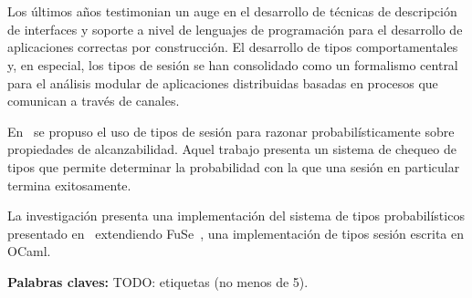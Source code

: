 \chapter*{\runtitulo}

Los últimos años testimonian un auge en el desarrollo de técnicas de
descripción de interfaces y soporte a nivel de lenguajes de
programación para el desarrollo de aplicaciones correctas por construcción. El
desarrollo de tipos comportamentales y, en especial, los tipos de sesión
se han consolidado como un formalismo central para el análisis modular de
aplicaciones distribuidas basadas en procesos que comunican a través de canales.

En~\cite{DBLP:conf/concur/InversoMPTT20} se propuso el uso de tipos de sesión
para razonar probabilísticamente sobre propiedades de alcanzabilidad. Aquel
trabajo presenta un sistema de chequeo de tipos que permite determinar la
probabilidad con la que una sesión en particular termina exitosamente.

La investigación presenta una implementación del sistema de tipos
probabilísticos presentado en~\cite{DBLP:conf/concur/InversoMPTT20} extendiendo
FuSe~\cite{DBLP:journals/jfp/Padovani17}, una implementación de tipos sesión
escrita en OCaml.

\bigskip

\noindent\textbf{Palabras claves:} TODO: etiquetas (no menos de 5).
